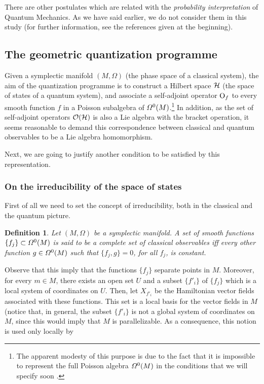 \documentclass[12pt]{article}
\theoremstyle{plain}
\newtheorem{definition}{Definition}
\def\H{{\cal H}}
\def\Op{{\rm O}}
\begin{document}
There are other postulates which are related with
the {\it probability interpretation} of Quantum Mechanics.
As we have said earlier, we do not consider them in this study
(for further information, see the references given at the beginning).


\subsection{The geometric quantization programme}


Given a symplectic manifold $(M,\Omega )$ (the phase space of a
classical system),
the aim of the quantization programme is to construct a Hilbert space
$\H$
(the space of states of a quantum system),
and associate a self-adjoint operator $\Op_f$
to every smooth function $f$ in a Poisson subalgebra of
${\mit\Omega}^0(M)$.\footnote{
The apparent modesty of this purpose is due to
the fact that it is impossible to represent the full Poisson algebra
${\mit\Omega}^0(M)$ in the conditions that we will specify soon
\cite{Vh-51}.
}
In addition, as the set of self-adjoint operators
${\cal O}(\H )$ is also a Lie algebra with the bracket operation,
it seems reasonable to demand this correspondence
between classical and quantum observables to be a Lie algebra
homomorphism.

Next, we are going to justify another condition to be satisfied by this
representation.


\subsubsection{On the irreducibility of the space of states}


First of all we need to set the concept of irreducibility,
both in the classical and the quantum picture.

\begin{definition}
Let $(M,\Omega )$ be a symplectic manifold.
A set of smooth functions $\{ f_j \} \subset {\mit\Omega}^0(M)$
is said to be a {\rm complete set of classical observables}
iff every other function $g \in {\mit\Omega}^0(M)$
such that $\{ f_j,g \} = 0$, for all $f_j$, is constant.
\end{definition}

Observe that this imply that
the functions $\{ f_j \}$ separate points in $M$.
Moreover, for every $m \in M$, there exists an open set $U$
and a subset $\{ f'_i \}$ of $\{ f_j \}$ which is a local system of
coordinates on $U$.
Then, let $X_{f'_i}$ be the Hamiltonian vector fields
associated with these functions. This set is a local basis for the
vector fields in $M$
(notice that, in general, the subset $\{ f'_i \}$ is not a global
system of coordinates on $M$, since this would imply that $M$
is parallelizable. As a consequence, this notion is used only locally by
\end{document}
